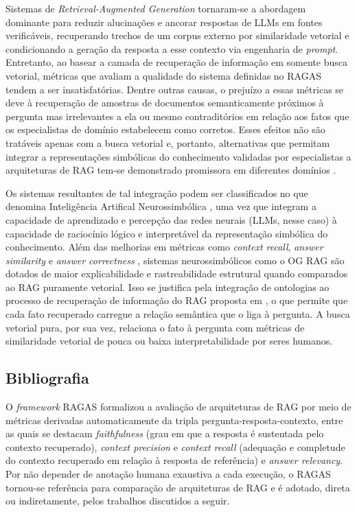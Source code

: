 \documentclass{article}
\begin{document}
	Sistemas de \textit{Retrieval-Augmented Generation} \cite{lewis2020retrieval} tornaram-se a abordagem dominante para reduzir alucinações e ancorar respostas de LLMs em fontes verificáveis, recuperando trechos de um corpus externo por similaridade vetorial e condicionando a geração da resposta a esse contexto via engenharia de \textit{prompt}. Entretanto, ao basear a camada de recuperação de informação em somente busca vetorial, métricas que avaliam a qualidade do sistema definidas no RAGAS \cite{es-etal-2024-ragas} tendem a ser insatisfatórias. Dentre outras causas, o prejuízo a essas métricas se deve à recuperação de amostras de documentos semanticamente próximos à pergunta mas irrelevantes a ela ou mesmo contraditórios em relação aos fatos que os especialistas de domínio estabelecem como corretos. Esses efeitos não são tratáveis apenas com a busca vetorial e, portanto, alternativas que permitam integrar a representações simbólicas do conhecimento validadas por especialistas a arquiteturas de RAG tem-se demonstrado promissora em diferentes domínios \cite{sharma2025ograg} \cite{feng2025ontologyrag}.
	
	Os sistemas resultantes de tal integração podem ser classificados no que denomina Inteligência Artifical Neurossimbólica \cite{shakarian2023neurosymbolic}, uma vez que integram 
	a capacidade de aprendizado e percepção das redes neurais (LLMs, nesse caso) à capacidade de raciocínio lógico e interpretável da representação simbólica do conhecimento. Além das melhorias em métricas como \textit{context recall}, \textit{answer similarity} e \textit{answer correctness} \cite{es-etal-2024-ragas}, sistemas neurossimbólicos como o OG RAG \cite{sharma2025ograg} são dotados de maior explicabilidade e rastreabilidade estrutural quando comparados ao RAG puramente vetorial. Isso se justifica pela integração de ontologias ao processo de recuperação de informação do RAG proposta em \cite{sharma2025ograg}, o que permite que cada fato recuperado carregue a relação semântica que o liga à pergunta. A busca vetorial pura, por sua vez, relaciona o fato à pergunta com métricas de similaridade vetorial de pouca ou baixa interpretabilidade por seres humanos.
	
	\subsection{Bibliografia}
	
	O \textit{framework} RAGAS \cite{es-etal-2024-ragas} formalizou a avaliação de arquiteturas de RAG por meio de métricas derivadas automaticamente da tripla pergunta-resposta-contexto, entre as quais se destacam \textit{faithfulness} (grau em que a resposta é sustentada pelo contexto recuperado), \textit{context precision} e \textit{context recall} (adequação e completude do contexto recuperado em relação à resposta de referência) e \textit{answer relevancy}. Por não depender de anotação humana exaustiva a cada execução, o RAGAS tornou-se referência para comparação de arquiteturas de RAG e é adotado, direta ou indiretamente, pelos trabalhos discutidos a seguir.
	
\end{document}
